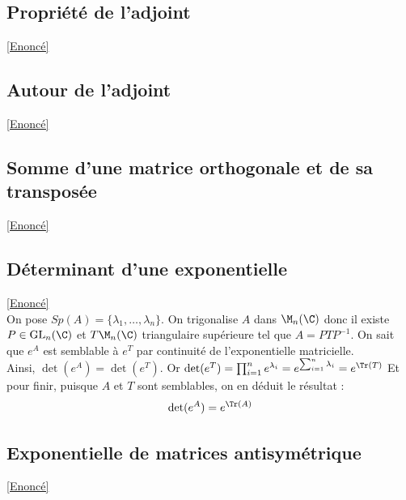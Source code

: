 \documentclass[8pt]{book}
\begin{document}
	\subsection{Propriété de l'adjoint}
	\label{Propriété de l'adjoint corrigé}
	\textcolor{blue}{\hyperref[Propriété de l'adjoint]{[Enoncé]}}\\
	
	\subsection{Autour de l'adjoint}
	\label{Autour de l'adjoint corrigé}
	\textcolor{blue}{\hyperref[Autour de l'adjoint]{[Enoncé]}}\\
	
	\subsection{Somme d'une matrice orthogonale et de sa transposée}
	\label{Somme d'une matrice orthogonale et de sa transposée corrigé}
	\textcolor{blue}{\hyperref[Somme d'une matrice orthogonale et de sa transposée]{[Enoncé]}}\\
	
	\subsection{Déterminant d'une exponentielle}
	\label{Déterminant d'une exponentielle corrigé}
	\textcolor{blue}{\hyperref[Déterminant d'une exponentielle]{[Enoncé]}}\\
	On pose $Sp(A)=\{\lambda_1,\dots,\lambda_n\}$.
	On trigonalise $A$ dans $\M_n(\C)$ donc il existe $P\in \text{GL}_n(\C)$ et $T\M_n(\C)$ triangulaire supérieure tel que $A=PTP^{-1}$.
	On sait que $e^A$ est semblable à $e^T$ par continuité de l'exponentielle matricielle.\\
	Ainsi, $\det(e^A)=\det(e^T)$.
	Or $\det(e^T)=\prod_{i=1}^ne^{\lambda_i}=e^{\sum_{i=1}^{n}\lambda_i}=e^{\Tr(T)}$
	Et pour finir, puisque $A$ et $T$ sont semblables, on en déduit le résultat : \[\det(e^A)=e^{\Tr(A)}\]
	
	\subsection{Exponentielle de matrices antisymétrique}
	\label{Exponentielle de matrices antisymétriques corrigé}
	\textcolor{blue}{\hyperref[Exponentielle de matrices antisymétriques]{[Enoncé]}}\\
	
\end{document}
